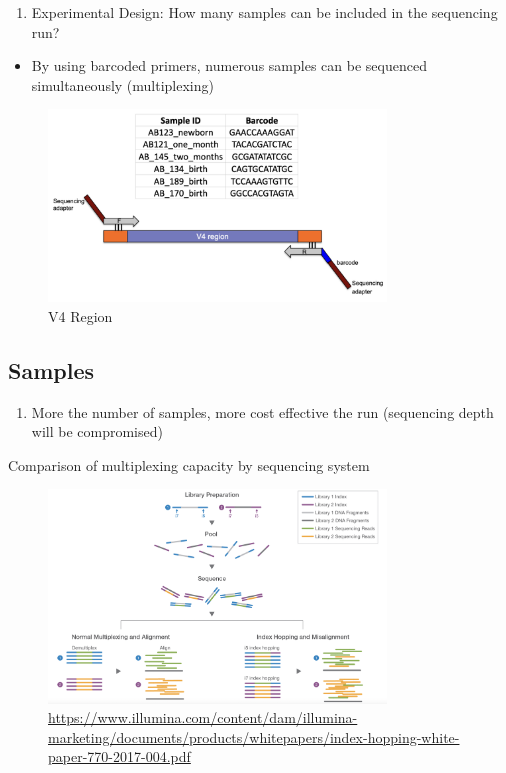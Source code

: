 \documentclass[
]{book}
\providecommand{\tightlist}{%
  \setlength{\itemsep}{0pt}\setlength{\parskip}{0pt}}
\begin{document}
\begin{enumerate}
\def\labelenumi{\arabic{enumi}.}
\tightlist
\item
  Experimental Design: How many samples can be included in the sequencing run?
\end{enumerate}

\begin{itemize}
\tightlist
\item
  By using barcoded primers, numerous samples can be sequenced simultaneously (multiplexing)
\end{itemize}

\begin{figure}
\centering
\includegraphics[width=0.8\textwidth,height=\textheight]{./Figures/Barcode.png}
\caption{V4 Region}
\end{figure}

\hypertarget{samples}{%
\subsection{Samples}\label{samples}}

\begin{enumerate}
\def\labelenumi{\arabic{enumi}.}
\tightlist
\item
  More the number of samples, more cost effective the run (sequencing depth will be compromised)
\end{enumerate}

Comparison of multiplexing capacity by sequencing system

\begin{figure}
\centering
\includegraphics[width=0.8\textwidth,height=\textheight]{./Figures/Multiplex1.png}
\caption{\url{https://www.illumina.com/content/dam/illumina-marketing/documents/products/whitepapers/index-hopping-white-paper-770-2017-004.pdf}}
\end{figure}
\end{document}
